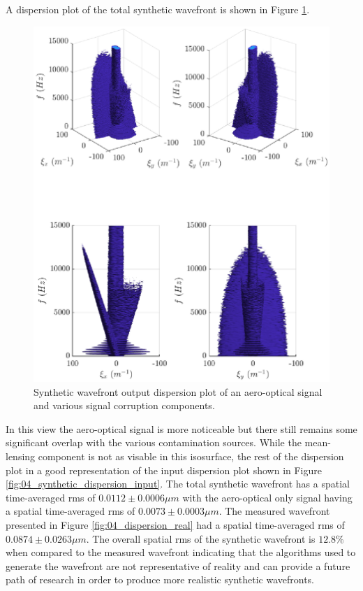 A dispersion plot of the total synthetic wavefront is shown in Figure \ref{fig:04_dispersion_synthetic}.
\begin{figure}
  \centering
  \includegraphics{../matlab/04_basic_filtering/dispersion_synthetic.eps}
  \caption{Synthetic wavefront output dispersion plot of an aero-optical signal and various signal corruption components.}
  \label{fig:04_dispersion_synthetic}
\end{figure}
In this view the aero-optical signal is more noticeable but there still remains some significant overlap with the various contamination sources.
While the mean-lensing component is not as visable in this isosurface, the rest of the dispersion plot in a good representation of the input dispersion plot shown in Figure \ref{fig:04_synthetic_dispersion_input}.
The total synthetic wavefront has a spatial time-averaged rms of $0.0112\pm0.0006\mu m$ with the aero-optical only signal having a spatial time-averaged rms of $0.0073\pm0.0003\mu m$.
The measured wavefront presented in Figure \ref{fig:04_dispersion_real} had a spatial time-averaged rms of $0.0874\pm0.0263\mu m$.
The overall spatial rms of the synthetic wavefront is $12.8\%$ when compared to the measured wavefront indicating that the algorithms used to generate the wavefront are not representative of reality and can provide a future path of research in order to produce more realistic synthetic wavefronts.

